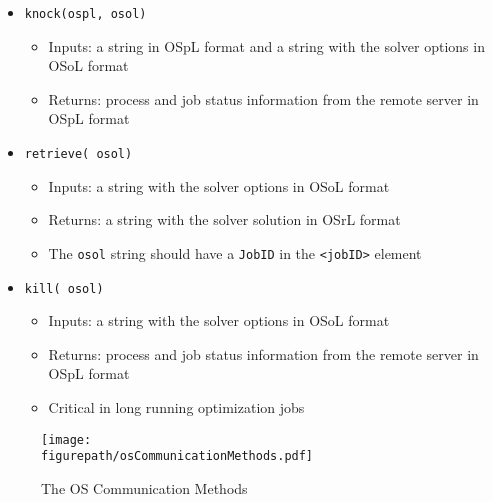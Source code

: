 \documentclass[11pt]{article}
\newcommand{\figurepath}{./figures}
\renewcommand{\_}{{\char"5F}}
\renewcommand{\{}{{\char"7B}}
\renewcommand{\}}{{\char"7D}}
\renewcommand{\^}{{\char"0D}}
\renewcommand{\'}{{\char"0D}}
\begin{document}
\begin{itemize}
\item {\tt knock(ospl, osol)}

\begin{itemize}

\item Inputs: a string in OSpL format and a string with the solver options in OSoL format

\item  Returns: process and job status information from the remote server in OSpL format

\end{itemize}

\item {\tt retrieve( osol)}


\begin{itemize}

\item Inputs: a string with the solver options  in OSoL format  

\item Returns: a string with the solver solution in OSrL format

\item The {\tt osol} string should have a {\tt JobID} in the {\tt <jobID>} element

\end{itemize}

\item {\tt kill( osol)}


\begin{itemize}

\item Inputs: a string with the solver options  in OSoL format  

\item  Returns: process and job status information from the remote server in OSpL format

\item  Critical in long running optimization jobs

\end{itemize}

\end{itemize}



\begin{figure}[ht]
\centering
\texttt{[image: \\figurepath/osCommunicationMethods.pdf]}
\caption{The OS Communication Methods} 
\label{figure:osCommunicationMethods}
\end{figure}
\end{document}
